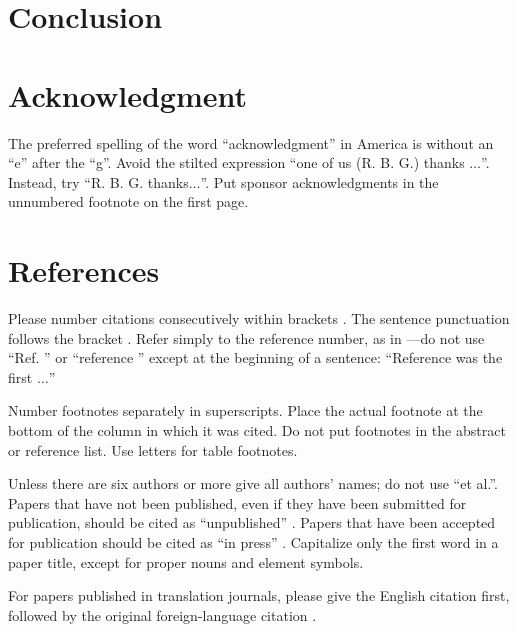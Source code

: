 \documentclass[conference]{IEEEtran}
\begin{document}
    \section{Conclusion}
    
    \section*{Acknowledgment}
    
    The preferred spelling of the word ``acknowledgment'' in America is without 
    an ``e'' after the ``g''. Avoid the stilted expression ``one of us (R. B. 
    G.) thanks $\ldots$''. Instead, try ``R. B. G. thanks$\ldots$''. Put sponsor 
    acknowledgments in the unnumbered footnote on the first page.
    
    \section*{References}
    
    Please number citations consecutively within brackets \cite{b1}. The 
    sentence punctuation follows the bracket \cite{b2}. Refer simply to the reference 
    number, as in \cite{b3}---do not use ``Ref. \cite{b3}'' or ``reference \cite{b3}'' except at 
    the beginning of a sentence: ``Reference \cite{b3} was the first $\ldots$''
    
    Number footnotes separately in superscripts. Place the actual footnote at 
    the bottom of the column in which it was cited. Do not put footnotes in the 
    abstract or reference list. Use letters for table footnotes.
    
    Unless there are six authors or more give all authors' names; do not use 
    ``et al.''. Papers that have not been published, even if they have been 
    submitted for publication, should be cited as ``unpublished'' \cite{b4}. Papers 
    that have been accepted for publication should be cited as ``in press'' \cite{b5}. 
    Capitalize only the first word in a paper title, except for proper nouns and 
    element symbols.
    
    For papers published in translation journals, please give the English 
    citation first, followed by the original foreign-language citation \cite{b6}.
    
\end{document}
